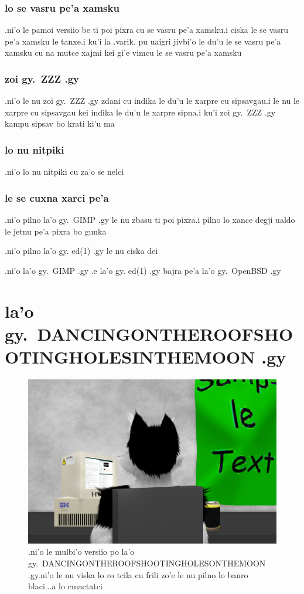 \documentclass{report}
\begin{document}
\subsection{lo se vasru pe'a xamsku}
.ni'o le pamoi versiio be ti poi pixra cu se vasru pe'a xamsku\@  .i ciska le se vasru pe'a xamsku le tanxe\@  .i ku'i la .varik. pu uaigri jivbi'o le du'u le se vasru pe'a xamsku cu na mutce xajmi kei gi'e vimcu le se vasru pe'a xamsku

\subsection{zoi gy.\ ZZZ .gy}
.ni'o le nu zoi gy.\ ZZZ .gy zdani cu indika le du'u le xarpre cu sipsavgau\@  .i le nu le xarpre cu sipsavgau kei indika le du'u le xarpre sipna\@  .i ku'i zoi gy.\ ZZZ .gy kampu sipsav bo krati ki'u ma

\subsection{lo nu nitpiki}
.ni'o lo nu nitpiki cu za'o se nelci

\subsection{le se cuxna xarci pe'a}
.ni'o pilno la'o gy.\ GIMP .gy le nu zbasu ti poi pixra\@  .i pilno lo xance degji ualdo le jetnu pe'a pixra bo gunka

.ni'o pilno la'o gy. ed(1) .gy le nu ciska dei

.ni'o la'o gy.\ GIMP .gy .e la'o gy. ed(1) .gy bajra pe'a la'o gy.\ OpenBSD .gy

\chapter{la'o gy.\ DANCINGONTHEROOFSHOOTINGHOLESINTHEMOON .gy}
\begin{figure}[ht]
	\centering
	\includegraphics[width=\textwidth]{dancingontheroofshootingholesinthemoon/dancingontheroofshootingholesinthemoon.png}
	\caption[center]{.ni'o le mulbi'o versiio po la'o gy.\ DANCINGONTHEROOFSHOOTINGHOLESONTHEMOON .gy\@  .ni'o le nu viska lo ro tcila cu frili zo'e le nu pilno lo banro blaci...a lo cmactatci}
\end{figure}
\end{document}
